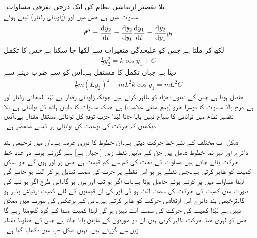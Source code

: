 \quad بلا تقصیر ارتعاشی نظام کی ایک درجی تفرقی مساوات۔\\
مساوات  میں  ہے جس میں  اور   (زاویائی رفتار) لیتے ہوئے
\begin{align*}
\theta''=\frac{\dif y_2}{\dif t}=\frac{\dif y_2}{\dif y_1}\frac{\dif y_1}{\dif t}=\frac{\dif y_2}{\dif y_1}y_2
\end{align*}
لکھ کر  ملتا ہے جس کو علیحدگی متغیرات سے  لکھا جا سکتا ہے جس کا تکمل
\begin{align}\label{مساوات_نظام_کل_توانائی_الف}
\frac{1}{2}y_2^2=k\cos y_1+C 
\end{align}
دیتا ہے جہاں  تکمل کا مستقل ہے۔اس کو  سے ضرب دینے سے
\begin{align*}
\frac{1}{2}m(Ly_2)^2-mL^2k\cos y_1=mL^2C
\end{align*}
حاصل ہوتا ہے جس کے تینوں اجزاء  کو ظاہر کرتے ہیں۔چونکہ  زاویائی رفتار ہے لہٰذا  لمحاتی رفتار اور    ہے۔درج بالا مساوات کا دوسرا جزو (بمع منفی علامت)  ہے جبکہ مساوات کا دایاں ہاتھ  کل توانائی ہے۔بلا تقصیر نظام میں توانائی کا ضیاع نہیں پایا جاتا لہٰذا حزب توقع کل توانائی مستقل مقدار ہے۔آئیں دیکھیں کہ حرکت کی نوعیت کل توانائی پر کیسے منحصر ہے۔

شکل -ب مختلف  کے لئے خط حرکت دیتی ہے۔ان خطوط کا دوری عرصہ  ہے۔ان میں ترخیمی بند دائرے اور  لہر نما خطوط شامل ہیں جن کے مابین نقطہ زین [ جہاں  ہے] سے گزرتے ہوئے دو عدد خط حرکت  پائے جاتے ہیں۔مساوات  کے تحت  کی کم سے کم قیمت  ہے جس پر  اور  ہوں گے جو ساکن کمیت کو ظاہر کرتی ہے۔جس نقطے پر  ہو اس نقطے پر حرت کی سمت تبدیل ہو کر الٹ ہو جائے گی لہٰذا مساوات  میں  پر کرتے ہوئے  حاصل ہوتا ہے۔اب اگر  ہو تب  اور یوں  ہو گا۔اس طرح اگر  ہو تب  کی صورت میں کمیت کی حرکت کی سمت الٹ ہو گی اور  کی ان قیمتوں  کے لئے کمیت ارتیاش پذیر ہو گا۔ترخیمی بند دائرے اس ارتعاشی حرکت کو ظاہر کرتے ہیں۔اس کے برعکس  کی صورت میں  ممکن نہیں ہے لہٰذا کمیت کی حرکت کی سمت الٹ نہیں ہو گی لہٰذا کمیت مبدا  کے گرد گھومتا رہے گا جس کو لہری خط حرکت ظاہر کرتی ہیں۔ان دو صورتوں کے مابین  پایا جاتا ہے جس کے خطوط نقطہ زین  سے گزرتے ہیں۔انہیں شکل -ب  میں دکھایا گیا ہے۔

